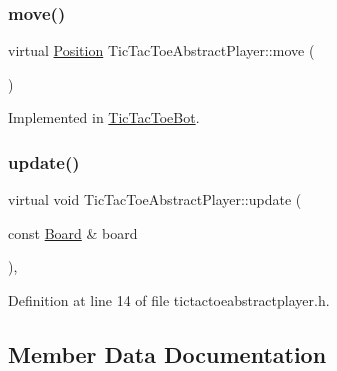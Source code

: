 \mbox{\label{class_tic_tac_toe_abstract_player_afccee4c01b399ecb12efc950474b6924}} 
\subsubsection{\texorpdfstring{move()}{move()}}
{\footnotesize\ttfamily virtual \hyperlink{common__defs_8h_af9623b96ea87eb8f2d0fe97e45b0f79a}{Position} Tic\+Tac\+Toe\+Abstract\+Player\+::move (\begin{DoxyParamCaption}{ }\end{DoxyParamCaption})\hspace{0.3cm}{\ttfamily [pure virtual]}}



Implemented in \hyperlink{class_tic_tac_toe_bot_a66939785d51528036aab9cc37dd5fad5}{Tic\+Tac\+Toe\+Bot}.

\mbox{\label{class_tic_tac_toe_abstract_player_a0c307236b6413d44d2489f24ef85507a}} 
\subsubsection{\texorpdfstring{update()}{update()}}
{\footnotesize\ttfamily virtual void Tic\+Tac\+Toe\+Abstract\+Player\+::update (\begin{DoxyParamCaption}\item[{const \hyperlink{common__defs_8h_a0dc5e1c0d1c3d4b1e210c805de5ca27b}{Board} \&}]{board }\end{DoxyParamCaption})\hspace{0.3cm}{\ttfamily [inline]}, {\ttfamily [virtual]}}



Definition at line 14 of file tictactoeabstractplayer.\+h.



\subsection{Member Data Documentation}
\mbox{\label{class_tic_tac_toe_abstract_player_a5e35542f7b938692f77a0274849cad7f}} 
